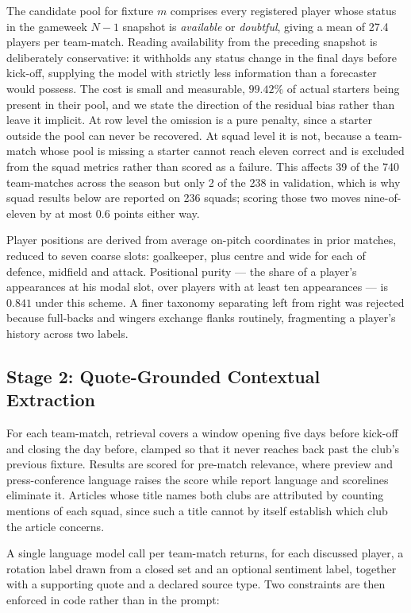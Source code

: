\documentclass[conference]{IEEEtran}
\begin{document}
The candidate pool for fixture $m$ comprises every registered player whose status in the gameweek $N-1$ snapshot is \emph{available} or \emph{doubtful}, giving a mean of 27.4 players per team-match. Reading availability from the preceding snapshot is deliberately conservative: it withholds any status change in the final days before kick-off, supplying the model with strictly less information than a forecaster would possess. The cost is small and measurable, $99.42\%$ of actual starters being present in their pool, and we state the direction of the residual bias rather than leave it implicit. At row level the omission is a pure penalty, since a starter outside the pool can never be recovered. At squad level it is not, because a team-match whose pool is missing a starter cannot reach eleven correct and is excluded from the squad metrics rather than scored as a failure. This affects 39 of the 740 team-matches across the season but only 2 of the 238 in validation, which is why squad results below are reported on 236 squads; scoring those two moves nine-of-eleven by at most $0.6$ points either way.

Player positions are derived from average on-pitch coordinates in prior matches, reduced to seven coarse slots: goalkeeper, plus centre and wide for each of defence, midfield and attack. Positional purity --- the share of a player's appearances at his modal slot, over players with at least ten appearances --- is $0.841$ under this scheme. A finer taxonomy separating left from right was rejected because full-backs and wingers exchange flanks routinely, fragmenting a player's history across two labels.

\subsection{Stage 2: Quote-Grounded Contextual Extraction}

For each team-match, retrieval covers a window opening five days before kick-off and closing the day before, clamped so that it never reaches back past the club's previous fixture. Results are scored for pre-match relevance, where preview and press-conference language raises the score while report language and scorelines eliminate it. Articles whose title names both clubs are attributed by counting mentions of each squad, since such a title cannot by itself establish which club the article concerns.

A single language model call per team-match returns, for each discussed player, a rotation label drawn from a closed set and an optional sentiment label, together with a supporting quote and a declared source type. Two constraints are then enforced in code rather than in the prompt:
\end{document}
